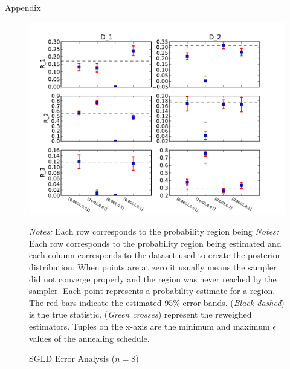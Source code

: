 \documentclass{article}
\begin{document}
\begin{section}{Appendix}
\begin{figure}
\caption{SGLD Error Analysis ($n=8$)}
\label{n8}
\begin{center}
\includegraphics[scale=0.7]{../figures/errors_n8.pdf}
\end{center}
{\scriptsize {\em Notes:} Each row corresponds to the probability region being {\em Notes:} Each row corresponds to the probability region being estimated and each column corresponds to the dataset used to create the posterior distribution. When points are at zero it usually means the sampler did not converge properly and the region was never reached by the sampler.  Each point represents a probability estimate for a region. The red bars indicate the estimated 95\% error bands.  ({\em Black dashed}) is the true statistic.  ({\em Green crosses}) represent the reweighed estimators. Tuples on the x-axis are the minimum and maximum $\epsilon$ values of the annealing schedule. }
\end{figure}


\end{section}
\end{document}
